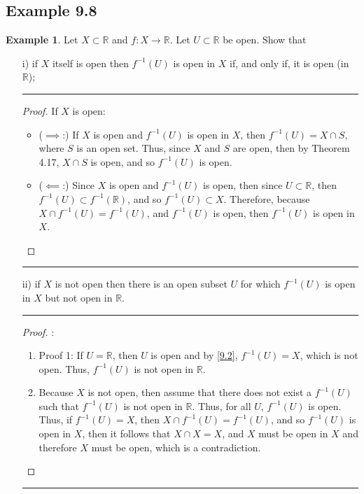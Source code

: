 \documentclass[openany, amssymb, psamsfonts]{amsart}
\newcommand{\bbR}{\mathbb{R}}
\theoremstyle{definition}
\newtheorem{exmp}{Example}[section]
\numberwithin{equation}{section}
\begin{document}
\subsection*{Example 9.8}
\begin{exmp}  
 \label{9.8}
Let $X\subset \bbR$ and $f:X\to \bbR.$ Let $U\subset \bbR$ be open.
Show that 
\begin{enumerate}
\item[i)] if $X$ itself is open then $f^{-1}(U)$ is open in $X$ if, and only if, it is open (in $\bbR$); 
\vspace{4pt}     \hrule   \vspace{4pt} \begin{proof}
If $X$ is open:
\begin{itemize}
    \item ($\implies$:) If $X$ is open and $f^{-1}(U)$ is open in $X$, then $f^{-1}(U) = X \cap S$, where $S$ is an open set. Thus, since $X$ and $S$ are open, then by Theorem 4.17, $X\cap S$ is open, and so $f^{-1}(U)$ is open.
    \item ($\impliedby$:) Since $X$ is open and $f^{-1}(U)$ is open, then since $U \subset \bbR$, then $f^{-1}(U)\subset f^{-1}(\bbR)$, and so $f^{-1}(U) \subset X$. Therefore, because $X\cap f^{-1}(U) = f^{-1}(U)$, and $f^{-1}(U)$ is open, then $f^{-1}(U)$ is open in $X$. 
\end{itemize}
\end{proof} \vspace{4pt}     \hrule   \vspace{4pt}
\item[ii)] if $X$ is not open then there is an open subset $U$ for which $f^{-1}(U)$ is open in $X$ but not open in $\bbR.$
\vspace{4pt}     \hrule   \vspace{4pt} \begin{proof}:\\
\begin{enumerate}
    \item Proof 1: If $U = \bbR$, then $U$ is open and by \ref{9.2}, $f^{-1}(U) = X$, which is not open. Thus, $f^{-1}(U)$ is not open in $\bbR$.
    \item Because $X$ is not open, then assume that there does not exist a $f^{-1}(U)$ such that $f^{-1}(U)$ is not open in $\bbR$. Thus, for all $U$, $f^{-1}(U)$ is open. Thus, if $f^{-1}(U) = X$, then $X\cap f^{-1}(U) = f^{-1}(U)$, and so $f^{-1}(U)$ is open in $X$, then it follows that $X \cap X = X$, and $X$ must be open in $X$ and therefore $X$ must be open, which is a contradiction. 
\end{enumerate}
\end{proof} \vspace{4pt}     \hrule   \vspace{4pt}
\end{enumerate}

\end{exmp}
\end{document}
